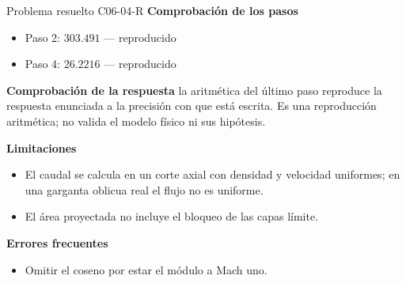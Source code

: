 \documentclass[10pt,openany]{book}
\begin{document}
\begin{studiumworked}{Problema resuelto C06-04-R}
\noindent\textbf{Comprobación de los pasos}
\begin{itemize}
\item Paso 2: $303.491$ — reproducido
\item Paso 4: $26.2216$ — reproducido
\end{itemize}

\noindent\textbf{Comprobación de la respuesta} la aritmética del último paso reproduce la respuesta enunciada a la precisión con que está escrita. Es una reproducción aritmética; no valida el modelo físico ni sus hipótesis.

\noindent\textbf{Limitaciones}
\begin{itemize}
\item El caudal se calcula en un corte axial con densidad y velocidad uniformes; en una garganta oblicua real el flujo no es uniforme.
\item El área proyectada no incluye el bloqueo de las capas límite.
\end{itemize}

\noindent\textbf{Errores frecuentes}
\begin{itemize}
\item Omitir el coseno por estar el módulo a Mach uno.
\end{itemize}
\end{studiumworked}
\end{document}
